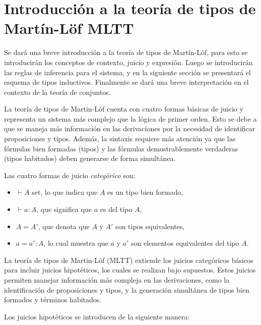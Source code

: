 \documentclass[11pt,oneside]{report}
\theoremstyle{plain}
\theoremstyle{definition}
\begin{document}
\section{Introducción a la teoría de tipos de Martín-Löf MLTT}

Se dará una breve introducción a la teoría de tipos de Martín-Löf, para esto se introducirán los conceptos de contexto, juicio y expresión. Luego se introducirán las reglas de inferencia para el sistema, y en la siguiente sección se presentará el esquema de tipos inductivos. Finalmente se dará una breve interpretación en el contexto de la teoría de conjuntos.

La teoría de tipos de Martin-Löf cuenta con cuatro formas básicas de juicio y representa un sistema más complejo que la lógica de primer orden. Esto se debe a que se maneja más información en las derivaciones por la necesidad de identificar proposiciones y tipos. Además, la sintaxis requiere más atención ya que las fórmulas bien formadas (tipos) y las fórmulas demostrablemente verdaderas (tipos habitados) deben generarse de forma simultánea.

Las cuatro formas de juicio \emph{categórico} son:

\begin{itemize}
  \item \(\vdash A\) set, lo que indica que \(A\) es un tipo bien formado,
  \item \(\vdash a:A\), que significa que \(a\) es del tipo \(A\),
  \item \(A = A'\), que denota que \(A\) y \(A'\) son tipos equivalentes,
  \item \(a = a':A\), lo cual muestra que \(a\) y \(a'\) son elementos equivalentes del tipo \(A\).
\end{itemize}

La teoría de tipos de Martin-Löf (MLTT) extiende los juicios categóricos básicos para incluir juicios hipotéticos, los cuales se realizan bajo supuestos. Estos juicios permiten manejar información más compleja en las derivaciones, como la identificación de proposiciones y tipos, y la generación simultánea de tipos bien formados y términos habitados.

Los juicios hipotéticos se introducen de la siguiente manera:
\end{document}
